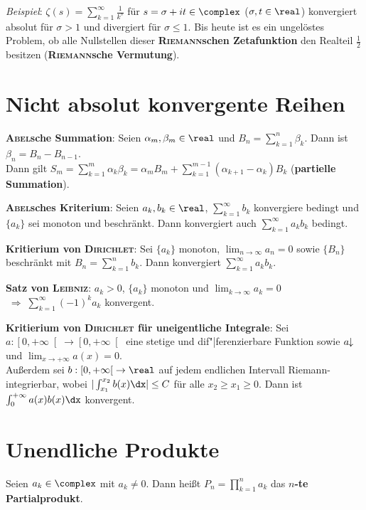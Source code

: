 \emph{Beispiel}: $\zeta(s) = \sum_{k=1}^\infty \frac{1}{k^s}$ für
$s = \sigma + it \in \complex$ ($\sigma, t \in \real$)
konvergiert absolut für $\sigma > 1$ und
divergiert für $\sigma \le 1$.
Bis heute ist es ein ungelöstes Problem, ob alle Nullstellen dieser
\textbf{\textsc{Riemann}schen Zetafunktion} den Realteil $\frac{1}{2}$ besitzen
(\textbf{\textsc{Riemann}sche Vermutung}).

\pagebreak

\section{%
    Nicht absolut konvergente Reihen%
}

\textbf{\textsc{Abel}sche Summation}:
Seien $\alpha_m, \beta_m \in \real$ und $B_n = \sum_{k=1}^n \beta_k$.
Dann ist $\beta_n = B_n - B_{n-1}$. \\
Dann gilt $S_m = \sum_{k=1}^m \alpha_k \beta_k =
\alpha_m B_m + \sum_{k=1}^{m-1} (\alpha_{k+1} - \alpha_k) B_k$
(\textbf{partielle Summation}).

\textbf{\textsc{Abel}sches Kriterium}:
Seien $a_k, b_k \in \real$, $\sum_{k=1}^\infty b_k$ konvergiere bedingt
und $\{a_k\}$ sei monoton und beschränkt.
Dann konvergiert auch $\sum_{k=1}^\infty a_k b_k$ bedingt.

\textbf{Kritierium von \textsc{Dirichlet}}:
Sei $\{a_k\}$ monoton, $\lim_{n \to \infty} a_n = 0$ sowie
$\{B_n\}$ beschränkt mit $B_n = \sum_{k=1}^n b_k$.
Dann konvergiert $\sum_{k=1}^\infty a_k b_k$.

\textbf{Satz von \textsc{Leibniz}}:
$a_k > 0$, $\{a_k\}$ monoton und $\lim_{k \to \infty} a_k = 0$
$\;\Rightarrow\; \sum_{k=1}^\infty (-1)^k a_k$ konvergent.

\textbf{Kritierium von \textsc{Dirichlet} für uneigentliche Integrale}:
Sei $a: \left[0, +\infty\right[ \rightarrow \left[0, +\infty\right[$ eine
stetige und dif"|ferenzierbare Funktion sowie $a\!\!\downarrow$ und
$\lim_{x \to +\infty} a(x) = 0$. \\
Außerdem sei $b: \left[0, +\infty\right[ \rightarrow \real$
auf jedem endlichen Intervall Riemann-integrierbar, wobei
$|\int_{x_1}^{x_2} b(x)\dx| \le C$ für alle $x_2 \ge x_1 \ge 0$. \qquad
Dann ist $\int_0^{+\infty} a(x)b(x)\dx$ konvergent.

\section{%
    Unendliche Produkte%
}

Seien $a_k \in \complex$ mit $a_k \not= 0$.
Dann heißt $P_n = \prod_{k=1}^n a_k$ das \textbf{$n$-te Partialprodukt}.

